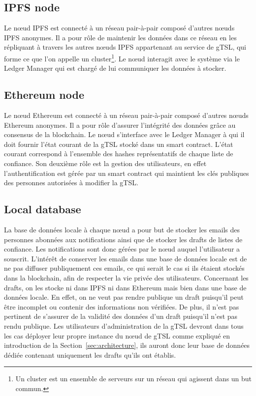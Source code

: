 \documentclass{tnreport}
\begin{document}
\subsection{IPFS node}

Le nœud IPFS est connecté à un réseau pair-à-pair composé d'autres nœuds IPFS anonymes. Il a pour rôle de maintenir les données dans ce réseau en les répliquant à travers les autres nœuds IPFS appartenant au service de gTSL, qui forme ce que l'on appelle un cluster\footnote{Un cluster est un ensemble de serveurs sur un réseau qui agissent dans un but commun.}. Le nœud interagit avec le système via le Ledger Manager qui est chargé de lui communiquer les données à stocker.

\subsection{Ethereum node}

Le nœud Ethereum est connecté à un réseau pair-à-pair composé d'autres nœuds Ethereum anonymes. Il a pour rôle d'assurer l'intégrité des données grâce au consensus de la blockchain. Le nœud s'interface avec le Ledger Manager à qui il doit fournir l'état courant de la gTSL stocké dans un smart contract. L'état courant correspond à l'ensemble des hashes représentatifs de chaque liste de confiance. Son deuxième rôle est la gestion des utilisateurs, en effet l'authentification est gérée par un smart contract qui maintient les clés publiques des personnes autorisées à modifier la gTSL.

\subsection{Local database}

La base de données locale à chaque nœud a pour but de stocker les emails des personnes abonnées aux notifications ainsi que de stocker les drafts de listes de confiance. Les notifications sont donc gérées par le nœud auquel l'utilisateur a souscrit. L'intérêt de conserver les emails dans une base de données locale est de ne pas diffuser publiquement ces emails, ce qui serait le cas si ils étaient stockés dans la blockchain, afin de respecter la vie privée des utilisateurs. Concernant les drafts, on les stocke ni dans IPFS ni dans Ethereum mais bien dans une base de données locale. En effet, on ne veut pas rendre publique un draft puisqu'il peut être incomplet ou contenir des informations non vérifiées. De plus, il n'est pas pertinent de s'assurer de la validité des données d'un draft puisqu'il n'est pas rendu publique. Les utilisateurs d'administration de la gTSL devront dans tous les cas déployer leur propre instance du nœud de gTSL comme expliqué en introduction de la Section~\ref{sec:architecture}, ils auront donc leur base de données dédiée contenant uniquement les drafts qu'ils ont établis.
\end{document}
